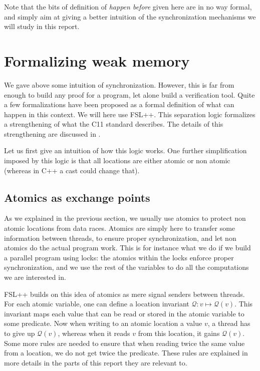 Note that the bits of definition of \emph{happen before} given here are in no way formal, and simply aim at giving a better intuition of the synchronization mechanisms we will study in this report.

\section{Formalizing weak memory}
We gave above some intuition of synchronization. However, this is far from enough to build any proof for a program, let alone build a verification tool. Quite a few formalizations have been proposed as a formal definition of what can happen in this context. We will here use FSL++\cite{fsl}. This separation logic formalizes a strengthening of what the C11 standard describes. The details of this strengthening are discussed in \cite{fsl}.

Let us first give an intuition of how this logic works. One further simplification imposed by this logic is that all locations are either atomic or non atomic (whereas in C++ a cast could change that).

\subsection{Atomics as exchange points}
As we explained in the previous section, we usually use atomics to protect non atomic locations from data races. Atomics are simply here to transfer some information between threads, to ensure proper synchronization, and let non atomics do the actual program work. This is for instance what we do if we build a parallel program using locks: the atomics within the locks enforce proper synchronization, and we use the rest of the variables to do all the computations we are interested in. 

FSL++ builds on this idea of atomics as mere signal senders between threads. For each atomic variable, one can define a location invariant $\mathcal{Q}: v \mapsto \mathcal{Q}(v)$. This invariant maps each value that can be read or stored in the atomic variable to some predicate. Now when writing to an atomic location a value $v$, a thread has to give up $\mathcal{Q}(v)$, whereas when it reads $v$ from this location, it gains $\mathcal{Q}(v)$. Some more rules are needed to ensure that when reading twice the same value from a location, we do not get twice the predicate. These rules are explained in more details in the parts of this report they are relevant to.

